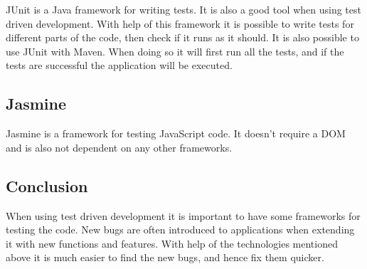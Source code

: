JUnit is a Java framework for writing tests. It is also a good tool when using test driven development.
With help of this framework it is possible to write tests for different parts of the code, then check if it runs as it should.
It is also possible to use JUnit with Maven.
When doing so it will first run all the tests, and if the tests are successful the application will be executed. \cite{JUnit}

\subsection{Jasmine}

Jasmine is a framework for testing JavaScript code.	
It doesn't require a DOM and is also not dependent on any other frameworks. \cite{Jasmine}

\subsection{Conclusion}

When using test driven development it is important to have some frameworks for testing the code.
New bugs are often introduced to applications when extending it with new functions and features.
With help of the technologies mentioned above it is much easier to find the new bugs, and hence fix them quicker.